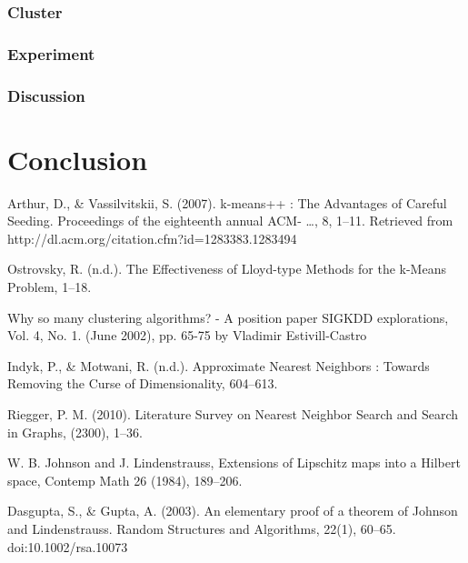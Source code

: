 \documentclass{article}
\begin{document}
\subsubsection{Cluster}

\subsubsection{Experiment}

\subsubsection{Discussion}

\section{Conclusion}


\begin{thebibliography}{99}
     Arthur, D., \& Vassilvitskii, S. (2007). k-means++ : The Advantages of
        Careful Seeding. Proceedings of the eighteenth annual ACM- …, 8, 1–11.
        Retrieved from http://dl.acm.org/citation.cfm?id=1283383.1283494

     Ostrovsky, R. (n.d.). The Effectiveness of Lloyd-type
        Methods for the k-Means Problem, 1–18.

     Why so many clustering algorithms? - A position paper SIGKDD
        explorations, Vol. 4, No. 1. (June 2002), pp. 65-75 by Vladimir
        Estivill-Castro

     Indyk, P., \& Motwani, R. (n.d.). Approximate Nearest Neighbors :
        Towards Removing the Curse of Dimensionality, 604–613.

     Riegger, P. M. (2010). Literature Survey on Nearest Neighbor Search and Search in Graphs, (2300), 1–36.

     W. B. Johnson and J. Lindenstrauss, Extensions of Lipschitz maps into a Hilbert space, Contemp Math 26 (1984), 189–206.

     Dasgupta, S., \& Gupta, A. (2003). An elementary proof of a theorem of Johnson and Lindenstrauss. Random Structures and Algorithms, 22(1), 60–65. doi:10.1002/rsa.10073
\end{thebibliography}
\end{document}
